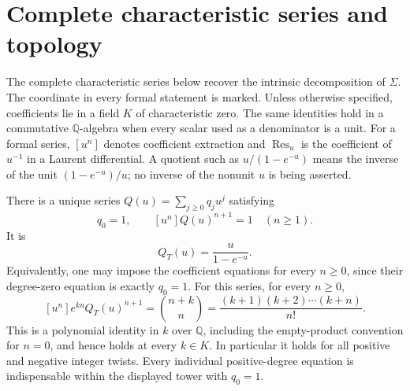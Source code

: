 \section{Complete characteristic series and topology}
\label{final:series}

The complete characteristic series below recover the intrinsic
decomposition of $\Sigma$. The coordinate in every formal statement
is marked. Unless
otherwise specified, coefficients lie in a field $K$ of characteristic
zero.  The same identities hold in a commutative $\mathbb Q$-algebra
when every scalar used as a denominator is a unit.  For a formal series,
$[u^n]$ denotes coefficient extraction and $\operatorname{Res}_u$ is
the coefficient of $u^{-1}$ in a Laurent differential.  A quotient
such as $u/(1-e^{-u})$ means the inverse of the unit
$(1-e^{-u})/u$; no inverse of the nonunit $u$ is being asserted.

\begin{theorem}
\label{final:F1}
There is a unique series $Q(u)=\sum_{j\geq0}q_ju^j$ satisfying
\[
 q_0=1,\qquad [u^n]Q(u)^{n+1}=1\quad(n\geq1).
\]
It is
\[
 Q_T(u)=\frac{u}{1-e^{-u}}.
\]
Equivalently, one may impose the coefficient equations for every
$n\geq0$, since their degree-zero equation is exactly $q_0=1$.
For this series, for every $n\geq0$,
\begin{equation}\label{final:todd-twists}
 [u^n]e^{ku}Q_T(u)^{n+1}
   =\binom{n+k}{n}
   =\frac{(k+1)(k+2)\cdots(k+n)}{n!}.
\end{equation}
This is a polynomial identity in $k$ over $\mathbb Q$, including the
empty-product convention for $n=0$, and hence holds at every $k\in K$.
In particular it holds for all positive and negative integer twists.
Every individual positive-degree equation is indispensable within the
displayed tower with $q_0=1$.
\end{theorem}

